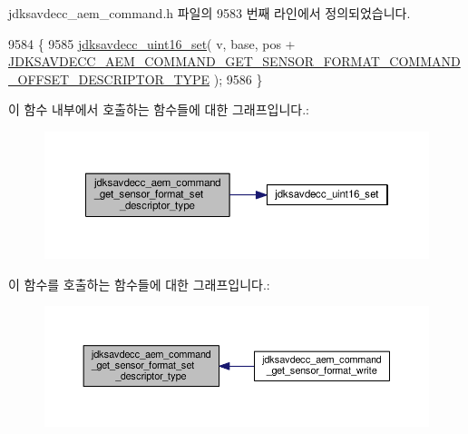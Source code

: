 jdksavdecc\+\_\+aem\+\_\+command.\+h 파일의 9583 번째 라인에서 정의되었습니다.


\begin{DoxyCode}
9584 \{
9585     \hyperlink{group__endian_ga14b9eeadc05f94334096c127c955a60b}{jdksavdecc\_uint16\_set}( v, base, pos + 
      \hyperlink{group__command__get__sensor__format_ga27ced9ca61e21385761c43642b952f7b}{JDKSAVDECC\_AEM\_COMMAND\_GET\_SENSOR\_FORMAT\_COMMAND\_OFFSET\_DESCRIPTOR\_TYPE}
       );
9586 \}
\end{DoxyCode}


이 함수 내부에서 호출하는 함수들에 대한 그래프입니다.\+:
\nopagebreak
\begin{figure}[H]
\begin{center}
\leavevmode
\includegraphics[width=350pt]{group__command__get__sensor__format_ga956a032afeec8d35ba6aae053a80b189_cgraph}
\end{center}
\end{figure}




이 함수를 호출하는 함수들에 대한 그래프입니다.\+:
\nopagebreak
\begin{figure}[H]
\begin{center}
\leavevmode
\includegraphics[width=350pt]{group__command__get__sensor__format_ga956a032afeec8d35ba6aae053a80b189_icgraph}
\end{center}
\end{figure}


